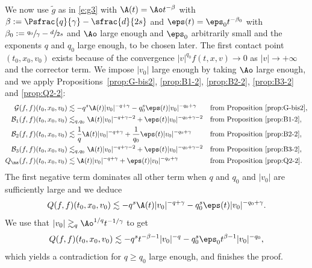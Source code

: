 We now use $\tilde g$ as in \eqref{e:g3} with $\A(t) = \Ao t^{-\beta}$
with $\beta:=\Psfrac{q}{\gamma}-\sfrac{d}{2s}$ and
$\eps(t) = \eps_0 t^{-\beta_0}$ with
$\beta_0:=\sfrac{q_0}{\gamma}-\sfrac{d}{2s}$ and $\Ao$ large enough and
$\eps_0$ arbitrarily small and the exponents $q$ and $q_0$ large
enough, to be chosen later. The first contact point $(t_0,x_0,v_0)$
exists because of the convergence $|v|^{q_0} f(t,x,v) \to 0$ as
$|v| \to +\infty$ and the corrector term. We impose $|v_0|$ large
enough by taking $\Ao$ large enough, and we apply
Propositions~\ref{prop:G-bis2}, \ref{prop:B1-2}, \ref{prop:B2-2},
\ref{prop:B3-2} and \ref{prop:Q2-2}:
\begin{align*}
\mathcal G(f,f)(t_0,x_0,v_0)
&\lesssim - q^s \A(t) |v_0|^{-q+\gamma} - q_0^s \eps(t)
|v_0|^{-q_0+\gamma}
&& \text{from Proposition } \ref{prop:G-bis2},\\
\mathcal B_1 (f,f)(t_0,x_0,v_0)
&\lesssim_{q,q_0} \A(t) |v_0|^{-q+\gamma-2} + \eps(t)
|v_0|^{-q_0+\gamma-2}
&& \text{from Proposition } \ref{prop:B1-2}, \\
\mathcal B_2 (f,f)(t_0,x_0,v_0)
&\lesssim \frac 1 q \A(t) |v_0|^{-q+\gamma} + \frac 1 {q_0} \eps(t)
|v_0|^{-q_0+\gamma}
&& \text{from Proposition } \ref{prop:B2-2},\\
\mathcal B_3 (f,f)(t_0,x_0,v_0)
&\lesssim_{q,q_0} \A(t) |v_0|^{-q+\gamma-2} + \eps(t)
|v_0|^{-q_0+\gamma-2}
&& \text{from Proposition } \ref{prop:B3-2}, \\
Q_{\ns}(f,f)(t_0,x_0,v_0)
&\lesssim \A(t) |v_0|^{-q+\gamma} + \eps(t) |v_0|^{-q_0+\gamma}
&& \text{from Proposition } \ref{prop:Q2-2}.
\end{align*}
The first negative term dominates all other term when $q$ and $q_0$
and $|v_0|$ are sufficiently large and we deduce
\[ Q(f,f)(t_0,x_0,v_0) \lesssim -q^s \A(t) |v_0|^{-q+\gamma} - q_0^s
\eps(t)|v_0|^{-q_0+\gamma}.\] We use that
$|v_0| \gtrsim_q \Ao^{1/q} t^{-1/\gamma}$ to get
\[
Q(f,f)(t_0,x_0,v_0) \lesssim - q^s t^{-\beta-1} |v_0|^{-q} - q_0^s \eps_0
t^{\beta-1} |v_0|^{-q_0},
\]
which yields a contradiction for $q \ge q_0$ large enough, and finishes the proof.

